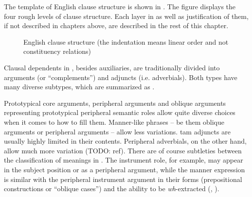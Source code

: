 \documentclass[UTF8, a4paper, oneside, scheme=plain, 12pt]{ctexbook}
\newcommand{\form}[1]{\emph{#1}}
\begin{document}
The template of English clause structure is shown in .
The figure displays the four rough levels of clause structure.
Each layer in  as well as justification of them,
if not described in chapters above, are described 
in the rest of this chapter.

\begin{figure}[H]
    \centering
    {\small }
    \caption{English clause structure (the indentation means linear order and not constituency relations)}
    \label{fig:clause-template}
\end{figure}

Clausal dependents in ,
besides auxiliaries, are traditionally divided into arguments (or ``complements'') 
and adjuncts (i.e. adverbials).
Both types have many diverse subtypes,
which are summarized as .

Prototypical core arguments,
peripheral arguments and oblique arguments representing prototypical peripheral semantic roles 
allow quite diverse choices when it comes to how to fill them.
Manner-like phrases -- be them oblique arguments or peripheral arguments -- 
allow less variations.
\acs{tam} adjuncts are usually highly limited in their contents.
Peripheral adverbials, on the other hand,
allow much more variation (TODO: ref).
There are of course subtleties between the classification of meanings in .
The instrument role, for example, 
may appear in the subject position or as a peripheral argument, 
while the manner expression is similar with the peripheral instrument argument 
in their forms (prepositional constructions or ``oblique cases'')
and the ability to be \form{wh}-extracted
(, ).
\end{document}
